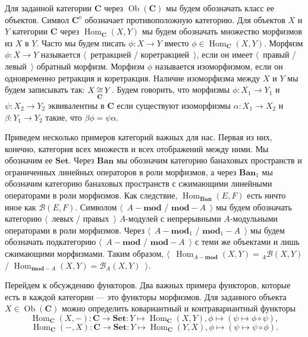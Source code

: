 Для заданной категории $\mathbf{C}$ через $\operatorname{Ob}(\mathbf{C})$ мы
будем обозначать класс ее объектов. Символ $\mathbf{C}^o$ обозначает
противоположную категорию. Для объектов $X$ и $Y$ категории $\mathbf{C}$ через
$\operatorname{Hom}_{\mathbf{C}}(X, Y)$ мы будем обозначать множество морфизмов
из $X$ в $Y$. Часто мы будем писать $\phi:X\to Y$ вместо
$\phi\in\operatorname{Hom}_{\mathbf{C}}(X,Y)$. Морфизм $\phi:X\to Y$ называется
$\langle$~ретракцией / коретракцией~$\rangle$, если он имеет $\langle$~правый /
левый~$\rangle$ обратный морфизм. Морфизм $\phi$ называется изоморфизмом, если
он одновременно ретракция и коретракция. Наличие изоморфизма между $X$ и $Y$ мы
будем записывать так: $X\mathop{\mathbin{\cong}}\limits_{\mathbf{C}} Y$. Будем говорить, что морфизмы
$\phi:X_1\to Y_1$ и $\psi:X_2\to Y_2$ эквивалентны в $\mathbf{C}$ если
существуют изоморфизмы $\alpha:X_1\to X_2$ и $\beta:Y_1\to Y_2$ такие, что
$\beta\phi=\psi\alpha$.

Приведем несколько примеров категорий важных для нас. Первая из них, конечно,
категория всех множеств и всех отображений между ними. Мы обозначим ее
$\mathbf{Set}$. Через $\mathbf{Ban}$ мы обозначим категорию банаховых
пространств и ограниченных линейных операторов в роли морфизмов, а через
$\mathbf{Ban}_1$ мы обозначим категорию банаховых пространств с сжимающими
линейными операторами в роли морфизмов. Как следствие,
$\operatorname{Hom}_{\mathbf{Ban}}(E,F)$ есть ничто иное как $\mathcal{B}(E,F)$.
Символом $\langle$~$A-\mathbf{mod}$ / $\mathbf{mod}-A$~$\rangle$ мы будем
обозначать категорию $\langle$~левых / правых~$\rangle$ $A$-модулей с
непрерывными $A$-модульными операторами в роли морфизмов. Через
$\langle$~$A-\mathbf{mod}_1$ / $\mathbf{mod}_1-A$~$\rangle$ мы будем обозначать
подкатегорию $\langle$~$A-\mathbf{mod}$ / $\mathbf{mod}-A$~$\rangle$ с теми же
объектами и лишь сжимающими морфизмами. Таким образом,
$\langle$~$\operatorname{Hom}_{A-\mathbf{mod}}(X,Y)={}_A\mathcal{B}(X,Y)$ /
$\operatorname{Hom}_{\mathbf{mod}-A}(X,Y)=\mathcal{B}_A(X,Y)$~$\rangle$.

Перейдем к обсуждению функторов. Два важных примера функторов, которые есть в
каждой категории --- это функторы морфизмов. Для заданного объекта
$X\in\operatorname{Ob}(\mathbf{C})$ можно определить ковариантный и
контравариантный функторы
$$
\operatorname{Hom}_{\mathbf{C}}(X,-)
:\mathbf{C}\to\mathbf{Set}
:Y\mapsto \operatorname{Hom}_{\mathbf{C}}(X,Y), 
\phi\mapsto(\psi\mapsto \phi\circ\psi),
$$
$$
\operatorname{Hom}_{\mathbf{C}}(-,X)
:\mathbf{C}\to\mathbf{Set}
:Y\mapsto \operatorname{Hom}_{\mathbf{C}}(Y,X), 
\phi\mapsto(\psi\mapsto \psi\circ\phi).
$$

